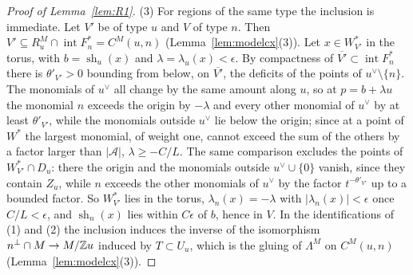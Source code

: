 \begin{proof}[Proof of Lemma~\ref{lem:R1}]
(3) For regions of the same type the inclusion is immediate. Let $V'$ be of type $u$ and $V$ of type $n$. Then
$V'\subseteq R^M_u\cap\operatorname{int}F^*_n=C^M(u,n)$ (Lemma~\ref{lem:modelcx}(3)). Let $x\in W^*_{V'}$ in the torus, with
$b=\operatorname{sh}_u(x)$ and $\lambda=\lambda_u(x)<\epsilon$. By compactness of $\overline{V'}\subset\operatorname{int}F^*_n$
there is $\theta'_{V'}>0$ bounding from below, on $\overline{V'}$, the deficits of the points of $u^\vee\setminus\{n\}$. The
monomials of $u^\vee$ all change by the same amount along $u$, so at $p=b+\lambda u$ the monomial $n$ exceeds the origin by
$-\lambda$ and every other monomial of $u^\vee$ by at least $\theta'_{V'}$, while the monomials outside $u^\vee$ lie below the
origin; since at a point of $W^*$ the largest monomial, of weight one, cannot exceed the sum of the others by a factor
larger than $|\mathcal A|$, $\lambda\ge-C/L$. The same comparison excludes the points of $W^*_{V'}\cap D_u$: there the
origin and the monomials outside $u^\vee\cup\{0\}$ vanish, since they contain $Z_u$, while $n$ exceeds the other monomials
of $u^\vee$ by the factor $t^{-\theta'_{V'}}$ up to a bounded factor. So $W^*_{V'}$ lies in the torus, $\lambda_n(x)=-\lambda$ with $|\lambda_n(x)|
<\epsilon$ once $C/L<\epsilon$, and $\operatorname{sh}_n(x)$ lies within $C\epsilon$ of $b$, hence in $V$. In the
identifications of (1) and (2) the inclusion induces the inverse of the isomorphism $n^\perp\cap M\to M/\mathbb Z u$ induced by
$T\subset U_u$, which is the gluing of $\Lambda^M$ on $C^M(u,n)$ (Lemma~\ref{lem:modelcx}(3)).
\end{proof}

